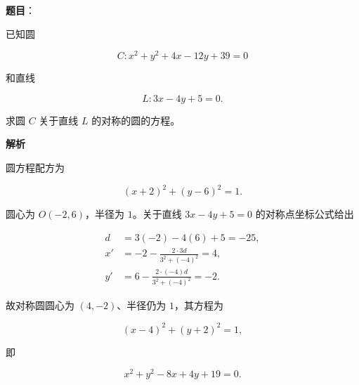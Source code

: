 \begin{answer}

\textbf{题目}：

已知圆

\nopagebreak[4]
\[
C:x^2+y^2+4x-12y+39=0
\]

和直线

\nopagebreak[4]
\[
L:3x-4y+5=0.
\]

求圆 $C$ 关于直线 $L$ 的对称的圆的方程。

\textbf{解析}

圆方程配方为

\nopagebreak[4]
\[
(x+2)^2+(y-6)^2=1.
\]

圆心为 $O(-2,6)$，半径为 $1$。关于直线
$3x-4y+5=0$ 的对称点坐标公式给出

\nopagebreak[4]
\[
\begin{aligned}
d&=3(-2)-4(6)+5=-25,\\
x'&=-2-\frac{2\cdot3d}{3^2+(-4)^2}=4,\\
y'&=6-\frac{2\cdot(-4)d}{3^2+(-4)^2}=-2.
\end{aligned}
\]

故对称圆圆心为 $(4,-2)$、半径仍为 $1$，其方程为

\nopagebreak[4]
\[
(x-4)^2+(y+2)^2=1,
\]

即

\nopagebreak[4]
\[
x^2+y^2-8x+4y+19=0.
\]


\end{answer}
